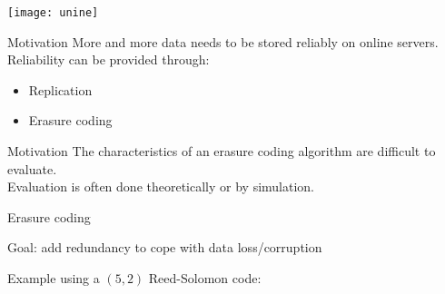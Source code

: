 {}




\begin{frame}[plain]
  
\titlepage

\begin{center}
\texttt{[image: unine]}
\end{center}

\end{frame}


\subtitle[Introduction]{Introduction}

\begin{frame}{Motivation}
    More and more data needs to be stored reliably on online servers.
    Reliability can be provided through:
    \begin{itemize}
        \item<1> Replication
        \item<1-2> Erasure coding
    \end{itemize}
\end{frame}

\begin{frame}{Motivation}
    The characteristics of an erasure coding algorithm are difficult to evaluate.\\
    Evaluation is often done theoretically or by simulation.
\end{frame}

\begin{frame}{Erasure coding}
    \begin{snugshade}
        Goal: add redundancy to cope with data loss/corruption
    \end{snugshade}

    Example using a $\left(5,2\right)$ Reed-Solomon code:
    \begin{figure}
    
    \end{figure}
\end{frame}

\subtitle[Architecture]{Architecture}

